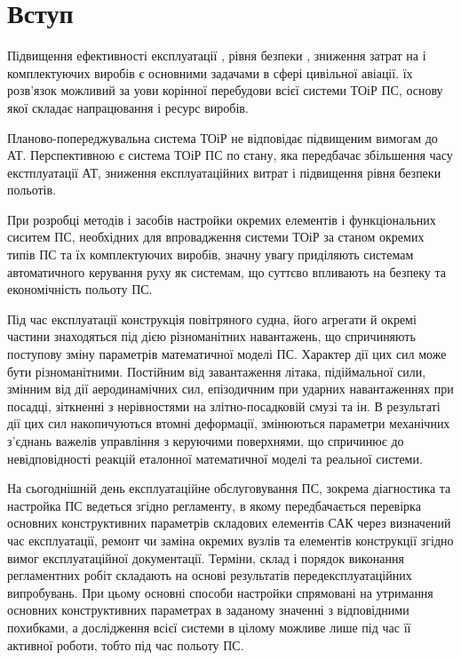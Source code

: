 \section*{Вступ}
Підвищення ефективності експлуатації 
, рівня безпеки 
, зниження затрат на 
 і 
комплектуючих виробів є основними задачами в сфері цивільної 
авіації. їх розв'язок можливий за уови корінної перебудови 
всієї системи ТОіР ПС, основу якої складає напрацювання і 
ресурс виробів.

Планово-попереджувальна система ТОіР не відповідає підвищеним 
вимогам до АТ. Перспективною є система ТОіР ПС по стану, яка 
передбачає збільшення часу екстплуатації АТ, зниження 
експлуатаційних витрат і підвищення рівня безпеки польотів.

При розробці методів і засобів настройки окремих елементів і 
функціональних сиситем ПС, необхідних для впровадження системи 
ТОіР за станом окремих типів ПС та їх комплектуючих виробів, 
значну увагу приділяють системам автоматичного керування руху 
як системам, що суттєво впливають на безпеку та економічність 
польоту ПС.

Під час експлуатації конструкція повітряного судна, його 
агрегати й окремі частини знаходяться під дією різноманітних 
навантажень, що спричиняють поступову зміну параметрів 
математичної моделі ПС.  Характер дії цих сил може бути 
різноманітними. Постійним від завантаження літака, підіймальної 
сили, змінним від дії аеродинамічних сил, епізодичним при 
ударних навантаженнях при посадці, зіткненні з нерівностями на 
злітно-посадковій смузі та ін. В результаті дії цих сил 
накопичуються втомні деформації, змінюються параметри механічних 
з'єднань важелів управління з керуючими поверхнями, що спричинює 
до невідповідності реакцій еталонної математичної моделі та 
реальної системи.

На сьогоднішній день експлуатаційне обслуговування ПС, зокрема 
діагностика та настройка  
ПС ведеться згідно регламенту, в 
якому передбачається перевірка основних конструктивних параметрів 
складових елементів САК через визначений час експлуатації, ремонт 
чи заміна окремих вузлів та елементів конструкції згідно вимог 
експлуатаційної документації. Терміни, склад і порядок виконання 
регламентних робіт складають на основі результатів 
передексплуатаційних випробувань. При цьому основні способи 
настройки спрямовані на утримання основних конструктивних 
параметрах в заданому значенні з відповідними похибками, а 
дослідження всієї системи в цілому можливе лише під час її 
активної роботи, тобто під час польоту ПС.
